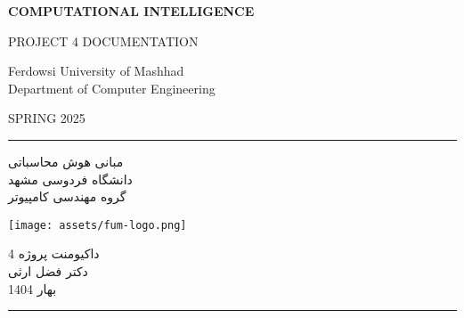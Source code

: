 \documentclass[a4paper,12pt]{article}
\begin{document}
	\begin{latin}
		\begin{titlepage}
			\thispagestyle{empty}
			\pagecolor{titlepagecolor}
			\color{white}
			\begin{center}
				
				{\fontsize{48}{0}\bfseries\selectfont \color{CustomAccent} COMPUTATIONAL INTELLIGENCE}
				
				\baselineskip
				{\fontsize{24}{0}\selectfont PROJECT 4 DOCUMENTATION}
				
				
				{\fontsize{20}{0}\selectfont \color{CustomAccent}
					Ferdowsi University of Mashhad \\
					Department of Computer Engineering
				}
				
				\baselineskip
				{\Large SPRING 2025}
				
			\end{center}
		\end{titlepage}
	\end{latin}
	
	\clearpage
	\nopagecolor
	\pagecolor{CustomBackground}
	\color{white}
	
	\hrule \medskip
	\begin{minipage}{0.295\textwidth}
		\raggedleft \color{CustomAccent}
		مبانی هوش محاسباتی\\
		دانشگاه فردوسی مشهد\\
		گروه مهندسی کامپیوتر
	\end{minipage}
	\begin{minipage}{0.4\textwidth}
		\centering 
		\texttt{[image: assets/fum-logo.png]}
	\end{minipage}
	\begin{minipage}{0.295\textwidth} \color{CustomAccent}
		داکیومنت پروژه 4 \\
		دکتر فضل ارثی \\
		بهار 1404
	\end{minipage}
	\medskip\hrule
	\bigskip	
	
\end{document}
